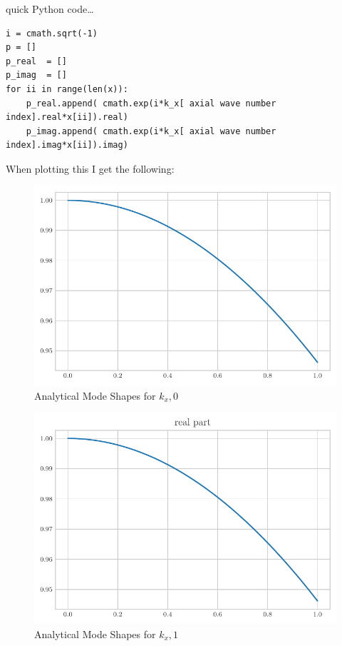 \documentclass[a4paper]{article}
\begin{document}
 quick Python code\dots
\begin{verbatim}
i = cmath.sqrt(-1)
p = []
p_real  = []
p_imag  = []
for ii in range(len(x)):
    p_real.append( cmath.exp(i*k_x[ axial wave number index].real*x[ii]).real)
    p_imag.append( cmath.exp(i*k_x[ axial wave number index].imag*x[ii]).imag)
\end{verbatim}

 When plotting this I get the following:
 \begin{figure}[h!]
     \centering
     \includegraphics{k_x_0_re.pdf}
     \caption{Analytical Mode Shapes for $k_x,0$}
     \label{fig:kx0}
 \end{figure}

 \begin{figure}[h!]
     \centering
     \includegraphics{k_x_1_re.pdf}
     \caption{Analytical Mode Shapes for $k_x,1$}
     \label{fig:kx0}
 \end{figure}
\end{document}
